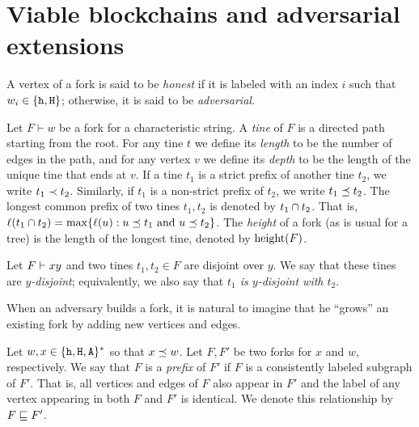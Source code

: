 \section{Viable blockchains and adversarial extensions}\label{sec:viable-blockchains-adv-extensions}
  A vertex of a fork is said to be \emph{honest} 
  if it is labeled with an index $i$ such that $w_i \in \{\mathtt{h}, \mathtt{H}\}$; 
  otherwise, it is said to be \emph{adversarial}.

  \begin{definition}
    Let $F \vdash w$ be a fork for a characteristic string.  A
    \emph{tine} of $F$ is a directed path starting from the root. For
    any tine $t$ we define its \emph{length} to be the number of edges
    in the path, and for any vertex $v$ we define its \emph{depth} to be
    the length of the unique tine that ends at $v$. 
    If a tine $t_1$ is a strict prefix of another tine $t_2$, we write $t_1 \prec t_2$. 
    Similarly, if $t_1$ is a non-strict prefix of $t_2$, we write $t_1 \preceq t_2$.
    The longest common prefix of two tines $t_1, t_2$ is denoted by $t_1 \cap t_2$. 
    That is, $\ell(t_1 \cap t_2) = \max\{\ell(u) : \text{$u \preceq t_1$ and $u \preceq t_2$} \}$. 
    The \emph{height} of
    a fork (as is usual for a tree) 
    is the length of the longest tine,
    denoted by $\operatorname{height}(F)$. 
  \end{definition}
  Let $F \vdash xy$ and 
  two tines $t_1, t_2 \in F$ are disjoint over $y$. 
  We say that these tines are \emph{$y$-disjoint}; 
  equivalently, we also say that \emph{$t_1$ is $y$-disjoint with $t_2$}.

  When an adversary builds a fork, it is natural to imagine that 
  he ``grows'' an existing fork by adding new vertices and edges. 
  \begin{definition}
    Let $w, x \in \{\mathtt{h}, \mathtt{H}, \mathtt{A}\}^*$ so that $x\preceq w$. 
    Let $F, F'$ be two forks for $x$ and $w$, respectively. 
    We say that $F$ is a \emph{prefix} of $F'$ if 
    $F$ is a consistently labeled subgraph of $F'$. 
    That is, all vertices and edges of $F$ also appear in $F'$ and 
    the label of any vertex appearing in both $F$ and $F'$ is identical. 
    We denote this relationship by $F\sqsubseteq F'$.
  \end{definition}

